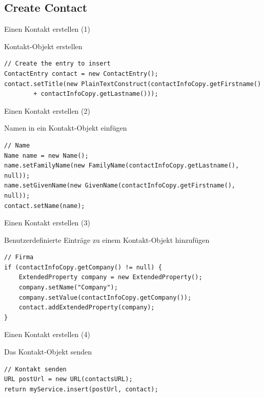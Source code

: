 \subsection*{Create Contact}

\begin{frame}[fragile]{Einen Kontakt erstellen (1)}
\begin{block}{Kontakt-Objekt erstellen}
\javalstset
\begin{lstlisting}
// Create the entry to insert
ContactEntry contact = new ContactEntry();
contact.setTitle(new PlainTextConstruct(contactInfoCopy.getFirstname()
		+ contactInfoCopy.getLastname()));
\end{lstlisting}
\end{block}
\end{frame}

\begin{frame}[fragile]{Einen Kontakt erstellen (2)}
\begin{block}{Namen in ein Kontakt-Objekt einfügen}
\javalstset
\begin{lstlisting}
// Name
Name name = new Name();
name.setFamilyName(new FamilyName(contactInfoCopy.getLastname(), null));
name.setGivenName(new GivenName(contactInfoCopy.getFirstname(), null));
contact.setName(name);
\end{lstlisting}
\end{block}
\end{frame}

\begin{frame}[fragile]{Einen Kontakt erstellen (3)}
\begin{block}{Benutzerdefinierte Einträge zu einem Kontakt-Objekt hinzufügen}
\javalstset
\begin{lstlisting}	
// Firma
if (contactInfoCopy.getCompany() != null) {
	ExtendedProperty company = new ExtendedProperty();
	company.setName("Company");
	company.setValue(contactInfoCopy.getCompany());
	contact.addExtendedProperty(company);
}
\end{lstlisting}
\end{block}
\end{frame}

\begin{frame}[fragile]{Einen Kontakt erstellen (4)}
\begin{block}{Das Kontakt-Objekt senden}
\javalstset
\begin{lstlisting}
// Kontakt senden		
URL postUrl = new URL(contactsURL);
return myService.insert(postUrl, contact);
\end{lstlisting}
\end{block}
\end{frame}

